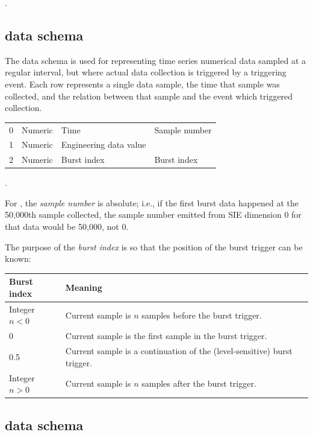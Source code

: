 \documentclass{article}
\begin{document}
.

\subsection{ data schema}

The  data schema is used for representing time series
numerical data sampled at a regular interval, but where actual data
collection is triggered by a triggering event.  Each row represents a
single data sample, the time that sample was collected, and the
relation between that sample and the event which triggered collection.

\begin{center}
  \begin{tabular}{llll}
    \schemaheader{} \\ \hline
    0 & Numeric & Time & Sample number \\
    1 & Numeric & Engineering data value & \undef{} \\
    2 & Numeric & Burst index & Burst index
  \end{tabular}
\end{center}

.

For , the \emph{sample number} is absolute; i.e., if
the first burst data happened at the 50,000th sample collected, the
sample number emitted from SIE dimension 0 for that data would be
50,000, not 0.

The purpose of the \emph{burst index} is so that the position of
the burst trigger can be known:

\begin{center}
  \begin{tabular}{ll}
    \textbf{Burst index} & \textbf{Meaning} \\ \hline
    Integer $n < 0$ & Current sample is $n$ samples before 
      the burst trigger. \\
    0 & Current sample is the first sample in the burst trigger. \\
    0.5 & Current sample is a continuation of the (level-sensitive) 
      burst trigger. \\
    Integer $n > 0$ & Current sample is $n$ samples after the 
      burst trigger.
  \end{tabular}
\end{center}

\subsection{ data schema}
\end{document}
